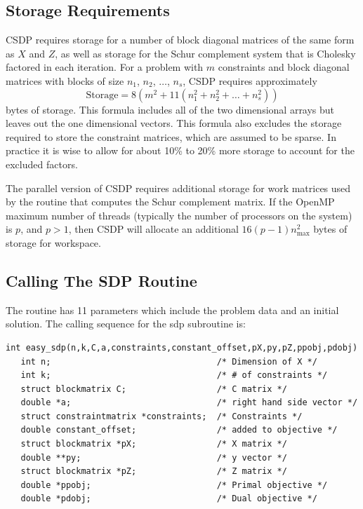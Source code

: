 \documentclass{article}
\begin{document}
\subsection*{Storage Requirements}
CSDP requires storage for a number of block diagonal matrices of the same
form as $X$ and $Z$, as well as storage for the Schur complement system that
is Cholesky factored in each iteration.  For a problem with $m$ constraints
and block diagonal matrices with blocks of size $n_{1}$, $n_{2}$, $\dots$, 
$n_{s}$, CSDP requires approximately 
\begin{equation}
\mbox{Storage}=8(m^{2}+11(n_{1}^{2}+n_{2}^{2}+\ldots+n_{s}^{2}))
\end{equation}
bytes of storage.  This formula includes all of the two dimensional
arrays but leaves out the one dimensional vectors.  This formula also
excludes the storage required to store the constraint matrices, which
are assumed to be sparse.  In practice it is wise to allow for about
10\% to 20\% more storage to account for the excluded factors.

The parallel version of CSDP requires additional storage for work
matrices used by the routine that computes the Schur complement
matrix.  If the OpenMP maximum number of threads (typically the number
of processors on the system) is $p$, and $p>1$, then CSDP will
allocate an additional $16(p-1)n_{\mbox{max}}^{2}$
bytes of storage for workspace.

\subsection*{Calling The SDP Routine}
The routine has 11 parameters which include the problem data and an
initial solution.  The calling sequence for the sdp subroutine is:

\begin{verbatim}
int easy_sdp(n,k,C,a,constraints,constant_offset,pX,py,pZ,ppobj,pdobj)
   int n;                                 /* Dimension of X */
   int k;                                 /* # of constraints */
   struct blockmatrix C;                  /* C matrix */
   double *a;                             /* right hand side vector */
   struct constraintmatrix *constraints;  /* Constraints */
   double constant_offset;                /* added to objective */
   struct blockmatrix *pX;                /* X matrix */
   double **py;                           /* y vector */
   struct blockmatrix *pZ;                /* Z matrix */
   double *ppobj;                         /* Primal objective */
   double *pdobj;                         /* Dual objective */
\end{verbatim}
\end{document}
